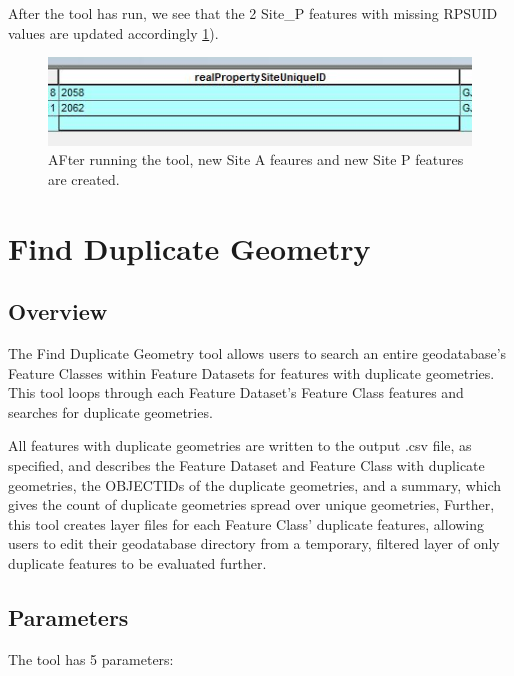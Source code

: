 \documentclass[openany]{book}
\theoremstyle{definition}
\theoremstyle{definition}
\theoremstyle{definition}
\theoremstyle{remark}
\begin{document}
After the tool has run, we see that the 2 Site\_P features with missing
RPSUID values are updated accordingly \ref{fig:sjcafter}).

\begin{figure}[H]

{\centering \includegraphics{figures/spatjoinCalc-after} 

}

\caption{AFter running the tool, new Site A feaures and new Site P features are created.}\label{fig:sjcafter}
\end{figure}

\hypertarget{dupGeom}{\chapter{Find Duplicate Geometry}\label{dupGeom}}

\section{Overview}\label{overview-3}

The Find Duplicate Geometry tool allows users to search an entire
geodatabase's Feature Classes within Feature Datasets for features with
duplicate geometries. This tool loops through each Feature Dataset's
Feature Class features and searches for duplicate geometries.

All features with duplicate geometries are written to the output .csv
file, as specified, and describes the Feature Dataset and Feature Class
with duplicate geometries, the OBJECTIDs of the duplicate geometries,
and a summary, which gives the count of duplicate geometries spread over
unique geometries, Further, this tool creates layer files for each
Feature Class' duplicate features, allowing users to edit their
geodatabase directory from a temporary, filtered layer of only duplicate
features to be evaluated further.

\section{Parameters}\label{parameters-3}

The tool has 5 parameters:
\end{document}
